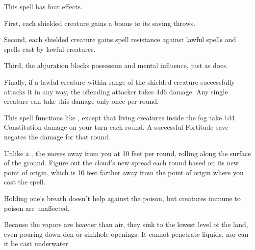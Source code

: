 \begin{spelleffect}
  This spell has four effects.
  \par First, each shielded creature gains a  bonus to its saving throws.
  \par Second, each shielded creature gains spell resistance against lawful spells and spells cast by lawful creatures.
  \par Third, the abjuration blocks possession and mental influence, just as  does.
  \par Finally, if a lawful creature within \rngmed range of the shielded creature successfully attacks it in any way, the offending attacker takes 4d6 damage. Any single creature can take this damage only once per round.
\end{spelleffect}

\begin{spelleffect}
  This spell functions like , except that living creatures inside the fog take 1d4 Constitution damage on your turn each round. A successful Fortitude save negates the damage for that round.
  \par Unlike a , the  moves away from you at 10 feet per round, rolling along the surface of the ground. Figure out the cloud's new spread each round based on its new point of origin, which is 10 feet farther away from the point of origin where you cast the spell.
\end{spelleffect}
\begin{spellnotes}
  Holding one's breath doesn't help against the poison, but creatures immune to poison are unaffected.
  \par Because the vapors are heavier than air, they sink to the lowest level of the land, even pouring down den or sinkhole openings. It cannot penetrate liquids, nor can it be cast underwater.
\end{spellnotes}

